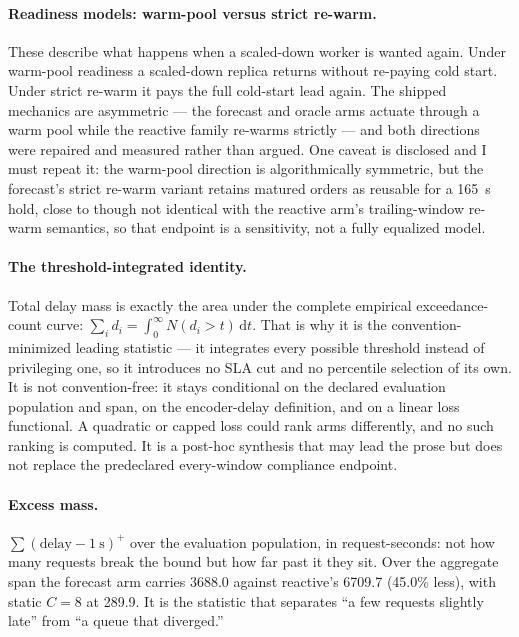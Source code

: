 \documentclass[11pt,a4paper]{article}
\def\emph#1{#1}\def\texttt#1{#1}%
\begin{document}
\paragraph{Readiness models: warm-pool versus strict re-warm.} These describe
what happens when a scaled-down worker is wanted again. Under \emph{warm-pool}
readiness a scaled-down replica returns without re-paying cold start. Under
\emph{strict re-warm} it pays the full cold-start lead again. The shipped
mechanics are asymmetric --- the forecast and oracle arms actuate through a
warm pool while the reactive family re-warms strictly --- and both directions
were repaired and measured rather than argued. One caveat is disclosed and I
must repeat it: the warm-pool direction is algorithmically symmetric, but the
forecast's strict re-warm variant retains matured orders as reusable for a
\SI{165}{\second} hold, close to though not identical with the reactive arm's
trailing-window re-warm semantics, so that endpoint is a sensitivity, not a
fully equalized model.

\paragraph{The threshold-integrated identity.} Total delay mass is exactly
the area under the complete empirical exceedance-count curve:
$\sum_i d_i = \int_0^\infty N(d_i > t)\,\mathrm{d}t$. That is why it is the
convention-minimized leading statistic --- it integrates \emph{every}
possible threshold instead of privileging one, so it introduces no SLA cut
and no percentile selection of its own. It is not convention-free: it stays
conditional on the declared evaluation population and span, on the
encoder-delay definition, and on a \emph{linear} loss functional. A quadratic
or capped loss could rank arms differently, and no such ranking is computed.
It is a post-hoc synthesis that may lead the prose but does not replace the
predeclared every-window compliance endpoint.

\paragraph{Excess mass.} $\sum(\text{delay} - \SI{1}{\second})^{+}$ over the
evaluation population, in request-seconds: not how many requests break the
bound but how far past it they sit. Over the aggregate span the forecast arm
carries \num{3688.0} against reactive's \num{6709.7} (45.0\% less), with
static $C{=}8$ at \num{289.9}. It is the statistic that separates ``a few
requests slightly late'' from ``a queue that diverged.''
\end{document}
